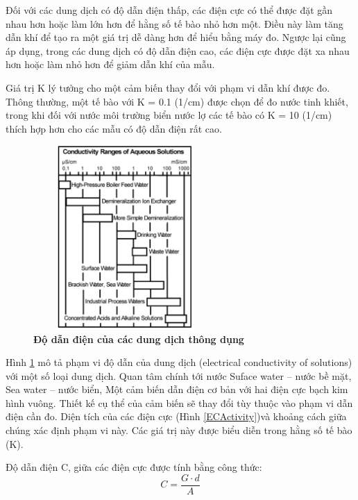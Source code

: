 \documentclass{article} %
\begin{document}
	Đối với các dung dịch có độ dẫn điện thấp, các điện cực có thể được đặt gần nhau hơn hoặc làm lớn hơn để hằng số tế bào nhỏ hơn một. Điều này làm tăng dẫn khí để tạo ra một giá trị dễ dàng hơn để hiểu bằng máy đo. Ngược lại cũng áp dụng, trong các dung dịch có độ dẫn điện cao, các điện cực được đặt xa nhau hơn hoặc làm nhỏ hơn để giảm dẫn khí của mẫu.
	
	Giá trị K lý tưởng cho một cảm biến thay đổi với phạm vi dẫn khí được đo. Thông thường, một tế bào với K = 0.1 (1/cm) được chọn để đo nước tinh khiết, trong khi đối với nước môi trường biển nước lợ các tế bào có K = 10 (1/cm) thích hợp hơn cho các mẫu có độ dẫn điện rất cao.
	
	\begin{figure}[!ht]
		\centering
		\includegraphics[width=7cm,height=7cm]{Images/dodandien.png}
		\caption[Độ dẫn điện của các dung dịch thông dụng\cite{Conductivity}]{\bfseries \fontsize{12pt}{0pt}\selectfont Độ dẫn điện của các dung dịch thông dụng\cite{Conductivity}}
		\label{dodandien}
	\end{figure}
	
	Hình \ref{dodandien} mô tả phạm vi độ dẫn của dung dịch (electrical conductivity of solutions) với một số loại dung dịch. Quan tâm chính tới nước Suface water – nước bề mặt, Sea water – nước biển,   Một cảm biến dẫn điện cơ bản với hai điện cực bạch kim hình vuông. Thiết kế cụ thể của cảm biến sẽ thay đổi tùy thuộc vào phạm vi dẫn điện cần đo. Diện tích của các điện cực (Hình \ref{ECActivity})và khoảng cách giữa chúng xác định phạm vi này. Các giá trị này được biểu diễn trong hằng số tế bào (K). 
	
	
	Độ dẫn điện C, giữa các điện cực được tính bằng công thức:
	\begin{equation}
		C = \frac{G \cdot d}{A}
	\end{equation}
	
\end{document}
